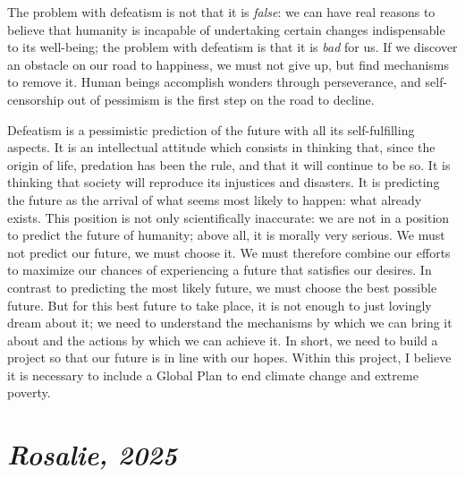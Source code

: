 \documentclass[a5paper,english,openany]{memoir}
\begin{document}
The problem with defeatism is not that it is \textit{false}: we can have real reasons to believe that humanity is incapable of undertaking certain changes indispensable to its well-being; the problem with defeatism is that it is \textit{bad} for us. If we discover an obstacle on our road to happiness, we must not %
give up, but find mechanisms to remove it. Human beings accomplish wonders through perseverance, and self-censorship out of pessimism is the first step on the road to decline. 

Defeatism is a pessimistic prediction of the future %
with all its self-fulfilling aspects. It is an intellectual attitude which consists in thinking that, since the origin of life, predation has been the rule, and that it will continue to be so. It is thinking %
that society will reproduce its injustices and disasters. It is predicting the future as the arrival of what seems most likely to happen: what already exists. This position is not only scientifically inaccurate: we are not in a position to predict the future of humanity; above all, it is morally very serious. %
 We %
 must not predict our future, %
 we must choose it. %
We must therefore combine our efforts to maximize %
our chances of experiencing a future that satisfies our desires. In contrast to predicting the most likely future, we must choose the best possible future. But for this best future to take place, it is not enough to just lovingly dream about it; %
we need to understand the mechanisms by which we can bring it about %
and the actions by which we can achieve it. In short, we need to build a project so that our future is in line with our hopes.
Within this project, I believe it is necessary to include a Global Plan to end climate change and extreme poverty. %

\chapter*{\textit{Rosalie, 2025}}\label{ch:narr_burkina}
\end{document}
